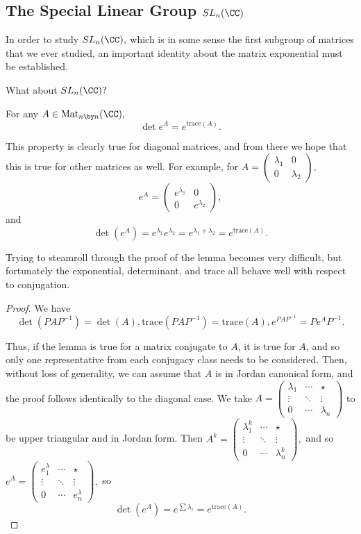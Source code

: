 \subsection{The Special Linear Group \texorpdfstring{$SL_n(\CC)$}{SLn(C)}}

In order to study $SL_n(\CC),$ which is in some sense the first subgroup of matrices that we ever studied, an important identity about the matrix exponential must be established.

\begin{qq}
What about $SL_n(\CC)?$
\end{qq}

\begin{lemma}\label{det trace}
For any $A \in \text{Mat}_{n \by n}(\CC),$ 
\[
\det e^A = e^{\text{trace}(A)}.
\]
\end{lemma}

This property is clearly true for diagonal matrices, and from there we hope that this is true for other matrices as well. For example, for $A = \begin{pmatrix} \lambda_1 & 0 \\ 0 & \lambda_2 \end{pmatrix}, $ 
\[
e^A = \begin{pmatrix}e^{\lambda_1} & 0 \\ 0 & e^{\lambda_2}\end{pmatrix},
\]
and 
\[\det(e^A) = e^{\lambda_1}e^{\lambda_2} = e^{\lambda_1 + \lambda_2} = e^{\text{trace}(A)}.\]

Trying to steamroll through the proof of the lemma becomes very difficult, but fortunately the exponential, determinant, and trace all behave well with respect to conjugation. 

\begin{proof}
We have 
\[
\det(PAP^{-1}) = \det(A), \text{trace}(PAP^{-1}) = \text{trace}(A), e^{PAP^{-1}} = Pe^AP^{-1}.
\]

Thus, if the lemma is true for a matrix conjugate to $A$, it is true for $A$, and so only one representative from each conjugacy class needs to be considered. Then, without loss of generality, we can assume that $A$ is in Jordan canonical form, and the proof follows identically to the diagonal case. We take
$
A = \begin{pmatrix} \lambda_1 & \cdots & \star \\ \vdots & \ddots & \vdots \\ 0 &\cdots  & \lambda_n\end{pmatrix}
$
to be upper triangular and in Jordan form. Then 
$
A^k = \begin{pmatrix} \lambda_1^k & \cdots & \star \\ \vdots & \ddots & \vdots \\ 0 &\cdots  & \lambda_n^k\end{pmatrix},
$
and so
$
e^A = \begin{pmatrix} e^\lambda_1 & \cdots & \star \\ \vdots & \ddots & \vdots \\ 0 &\cdots  & e^\lambda_n\end{pmatrix},
$
so 
\[
\det(e^A) = e^{\sum \lambda_i} = e^{\text{trace}(A)}.
\]
\end{proof}

